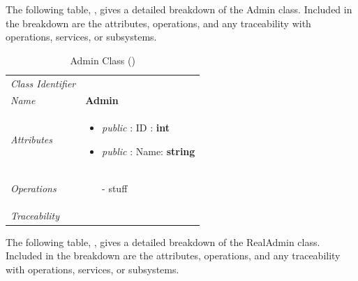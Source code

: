 \documentclass[12pt,letterpaper]{article}
\begin{document}
The following table, , gives a detailed breakdown of the Admin class. Included in the breakdown are the attributes, operations, and any traceability with operations, services, or subsystems.

\begin{table}[H]
    \caption{Admin Class ()} 
	\begin{tabu} to 
		\toprule
		Class Identifier &  \\
		Name & {\bf Admin} \\
		Attributes & 
		\begin{minipage}[t]{\linewidth}
		    \begin{itemize}
		        \item \textit{public} : ID : {\bf int}
		        \item \textit{public} : Name: {\bf string}
			\end{itemize}
	    \end{minipage} \\

		Operations &
		\begin{minipage}[t]{\linewidth}
			\begin{enumerate}
			    \item[-] stuff
	        \end{enumerate}
	    \end{minipage} \\
	    	Traceability & \\
		\toprule
	\end{tabu}
\end{table}

The following table, , gives a detailed breakdown of the RealAdmin class. Included in the breakdown are the attributes, operations, and any traceability with operations, services, or subsystems.
\end{document}
